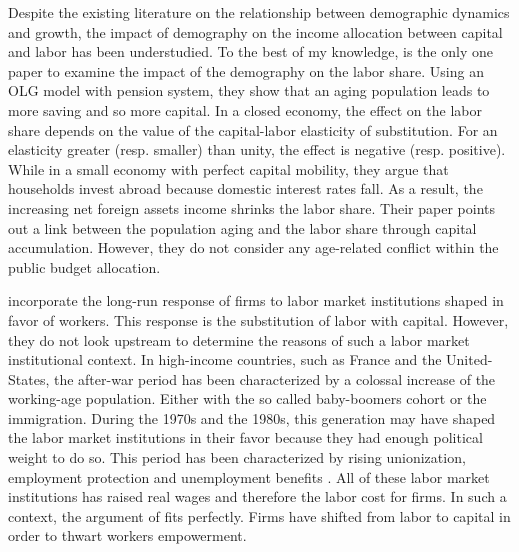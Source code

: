 
Despite the existing literature on the relationship between demographic dynamics and growth, the impact of demography on the income allocation between capital and labor has been understudied. 
To the best of my knowledge, \cite{Schmidt2013} is the only one paper to examine the impact of the demography on the labor share. Using an OLG model with pension system, they show that an aging population leads to more saving and so more capital. In a closed economy, the effect on the labor share depends on the value of the capital-labor elasticity of substitution. For an elasticity greater (resp. smaller) than unity, the effect is negative (resp. positive). While in a small economy with perfect capital mobility, they argue that households invest abroad because domestic interest rates fall. As a result, the increasing net foreign assets income shrinks the labor share. Their paper points out a link between the population aging and the labor share through capital accumulation. However, they do not consider any age-related conflict within the public budget allocation.

\cite{Caballero1998} incorporate the long-run response of firms to labor market institutions shaped in favor of workers. This response is the substitution of labor with capital. However, they do not look upstream to determine the reasons of such a labor market institutional context. In high-income countries, such as France and the United-States, the after-war period has been characterized by a colossal increase of the working-age population. Either with the so called baby-boomers cohort or the immigration. During the 1970s and the 1980s, this generation may have shaped the labor market institutions in their favor because they had enough political weight to do so. This period has been characterized by rising unionization, employment protection and unemployment benefits%
. All of these labor market institutions has raised real wages and therefore the labor cost for firms. In such a context, the argument of \cite{Caballero1998} fits perfectly. Firms have shifted from labor to capital in order to thwart workers empowerment.


